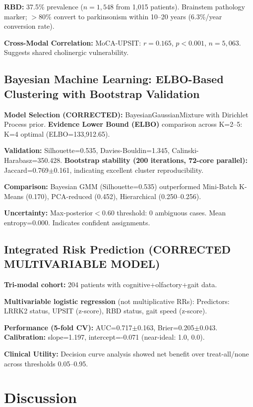 \documentclass[11pt]{article}
\begin{document}
\textbf{RBD:} 37.5\% prevalence ($n=1,548$ from 1,015 patients)\cite{schenck2013rbd}. Brainstem pathology marker; $>$80\% convert to parkinsonism within 10--20 years (6.3\%/year conversion rate\cite{postuma2019rbd,iranzo2021rbd}).

\textbf{Cross-Modal Correlation:} MoCA-UPSIT: $r=0.165$, $p<0.001$, $n=5,063$. Suggests shared cholinergic vulnerability\cite{bohnen2013cholinergic}.

\subsection{Bayesian Machine Learning: ELBO-Based Clustering with Bootstrap Validation}

\textbf{Model Selection (CORRECTED):} BayesianGaussianMixture with Dirichlet Process prior. \textbf{Evidence Lower Bound (ELBO)} comparison across K=2--5: K=4 optimal (ELBO=133,912.65).

\textbf{Validation:} Silhouette=0.535, Davies-Bouldin=1.345, Calinski-Harabasz=350.428. \textbf{Bootstrap stability (200 iterations, 72-core parallel):} Jaccard=0.769$\pm$0.161, indicating excellent cluster reproducibility.

\textbf{Comparison:} Bayesian GMM (Silhouette=0.535) outperformed Mini-Batch K-Means (0.170), PCA-reduced (0.452), Hierarchical (0.250--0.256).

\textbf{Uncertainty:} Max-posterior$<$0.60 threshold: 0 ambiguous cases. Mean entropy=0.000. Indicates confident assignments.

\subsection{Integrated Risk Prediction (CORRECTED MULTIVARIABLE MODEL)}

\textbf{Tri-modal cohort:} 204 patients with cognitive+olfactory+gait data.

\textbf{Multivariable logistic regression} (not multiplicative RRs): Predictors: LRRK2 status, UPSIT (z-score), RBD status, gait speed (z-score). 

\textbf{Performance (5-fold CV):} AUC=0.717$\pm$0.163, Brier=0.205$\pm$0.043. \textbf{Calibration:} slope=1.197, intercept=-0.071 (near-ideal: 1.0, 0.0).

\textbf{Clinical Utility:} Decision curve analysis showed net benefit over treat-all/none across thresholds 0.05--0.95.

\section{Discussion}
\end{document}
